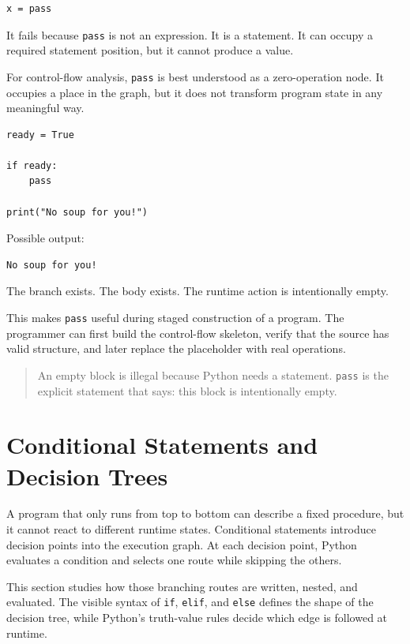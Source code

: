 \documentclass[a4paper,twoside]{report}
\begin{document}
\begin{verbatim}
x = pass
\end{verbatim}

It fails because \texttt{pass} is not an expression. It is a statement. It can occupy a required statement position, but it cannot produce a value.

For control-flow analysis, \texttt{pass} is best understood as a zero-operation node. It occupies a place in the graph, but it does not transform program state in any meaningful way.

\begin{verbatim}
ready = True

if ready:
    pass

print("No soup for you!")
\end{verbatim}

Possible output:

\begin{verbatim}
No soup for you!
\end{verbatim}

The branch exists. The body exists. The runtime action is intentionally empty.

This makes \texttt{pass} useful during staged construction of a program. The programmer can first build the control-flow skeleton, verify that the source has valid structure, and later replace the placeholder with real operations.

\begin{quote}
An empty block is illegal because Python needs a statement. \texttt{pass} is the explicit statement that says: this block is intentionally empty.
\end{quote}

\section{Conditional Statements and Decision Trees}

A program that only runs from top to bottom can describe a fixed procedure, but it cannot react to different runtime states. Conditional statements introduce decision points into the execution graph. At each decision point, Python evaluates a condition and selects one route while skipping the others.

This section studies how those branching routes are written, nested, and evaluated. The visible syntax of \texttt{if}, \texttt{elif}, and \texttt{else} defines the shape of the decision tree, while Python's truth-value rules decide which edge is followed at runtime.
\end{document}
